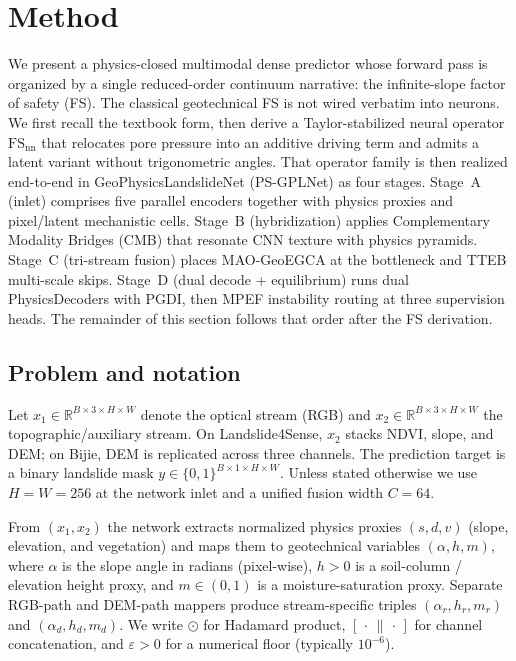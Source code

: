 \section{Method}
\label{sec:method}
We present a physics-closed multimodal dense predictor whose forward pass is organized by a single reduced-order continuum narrative: the infinite-slope factor of safety (FS). The classical geotechnical FS is not wired verbatim into neurons. We first recall the textbook form, then derive a Taylor-stabilized neural operator $\mathrm{FS}_{\mathrm{nn}}$ that relocates pore pressure into an additive driving term and admits a latent variant without trigonometric angles. That operator family is then realized end-to-end in GeoPhysicsLandslideNet (PS-GPLNet) as four stages. Stage~A (inlet) comprises five parallel encoders together with physics proxies and pixel/latent mechanistic cells. Stage~B (hybridization) applies Complementary Modality Bridges (CMB) that resonate CNN texture with physics pyramids. Stage~C (tri-stream fusion) places MAO-GeoEGCA at the bottleneck and TTEB multi-scale skips. Stage~D (dual decode + equilibrium) runs dual PhysicsDecoders with PGDI, then MPEF instability routing at three supervision heads. The remainder of this section follows that order after the FS derivation.

\subsection{Problem and notation}
\label{sec:problem}
Let \(x_1\in\mathbb{R}^{B\times 3\times H\times W}\) denote the optical stream (RGB) and \(x_2\in\mathbb{R}^{B\times 3\times H\times W}\) the topographic/auxiliary stream. On Landslide4Sense, \(x_2\) stacks NDVI, slope, and DEM; on Bijie, DEM is replicated across three channels. The prediction target is a binary landslide mask \(y\in\{0,1\}^{B\times 1\times H\times W}\). Unless stated otherwise we use \(H=W=256\) at the network inlet and a unified fusion width \(C=64\).

From \((x_1,x_2)\) the network extracts normalized physics proxies \((s,d,v)\) (slope, elevation, and vegetation) and maps them to geotechnical variables \((\alpha,h,m)\), where \(\alpha\) is the slope angle in radians (pixel-wise), \(h>0\) is a soil-column / elevation height proxy, and \(m\in(0,1)\) is a moisture-saturation proxy. Separate RGB-path and DEM-path mappers produce stream-specific triples \((\alpha_r,h_r,m_r)\) and \((\alpha_d,h_d,m_d)\). We write \(\odot\) for Hadamard product, \([\,\cdot\,\|\,\cdot\,]\) for channel concatenation, and \(\varepsilon>0\) for a numerical floor (typically \(10^{-6}\)).

